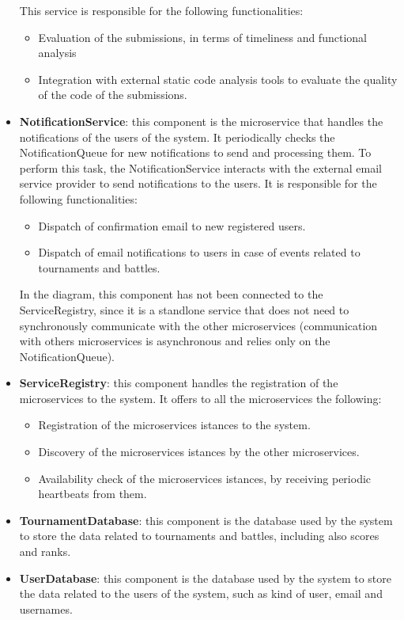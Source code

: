 \begin{itemize}
     This service is responsible for the following functionalities:
    \begin{itemize}
        \item Evaluation of the submissions, in terms of timeliness and functional analysis 
        \item Integration with external static code analysis tools to evaluate the quality of the code of the submissions.
    \end{itemize}
    \item \textbf{NotificationService}: this component is the microservice that handles the notifications of the users of the system. It periodically checks the NotificationQueue for new notifications to send and processing them. To perform this task, the NotificationService interacts with the external email service provider to send notifications to the users.
     It is responsible for the following functionalities:
    \begin{itemize}
        \item Dispatch of confirmation email to new registered users.
        \item Dispatch of email notifications to users in case of events related to tournaments and battles.
    \end{itemize}
    In the diagram, this component has not been connected to the ServiceRegistry, since it is a standlone service that does not need to synchronously communicate with the other microservices (communication with others microservices is asynchronous and relies only on the NotificationQueue).
    \item \textbf{ServiceRegistry}: this component handles the registration of the microservices to the system. It offers to all the microservices the following:
    \begin{itemize}
        \item Registration of the microservices istances to the system.
        \item Discovery of the microservices istances by the other microservices.
        \item Availability check of the microservices istances, by receiving periodic heartbeats from them.
    \end{itemize}
    \item \textbf{TournamentDatabase}: this component is the database used by the system to store the data related to tournaments and battles, including also scores and ranks.
    \item \textbf{UserDatabase}: this component is the database used by the system to store the data related to the users of the system, such as kind of user, email and usernames.

\end{itemize}
